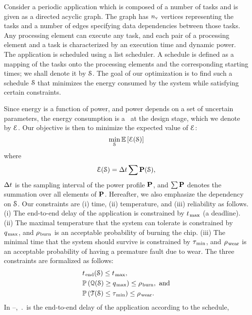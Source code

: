 Consider a periodic application which is composed of a number of tasks and is given as a directed acyclic graph.
The graph has ${n_\text{v}}$ vertices representing the tasks and a number of edges specifying data dependencies between those tasks.
Any processing element can execute any task, and each pair of a processing element and a task is characterized by an execution time and dynamic power.
The application is scheduled using a list scheduler.
A schedule is defined as a mapping of the tasks onto the processing elements and the corresponding starting times; we shall denote it by $\EuScript{S}$.
The goal of our optimization is to find such a schedule $\EuScript{S}$ that minimizes the energy consumed by the system while satisfying certain constraints.

Since energy is a function of power, and power depends on a set of uncertain parameters, the energy consumption is a \rv\ at the design stage, which we denote by $\EuScript{E}$.
Our objective is then to minimize the expected value of $\EuScript{E}$:
\begin{equation} \elab{objective}
  \min_{\schedule} \expectation{\qoiE(\schedule)}
\end{equation}
where
\[
  \EuScript{E}(\EuScript{S}) = \Delta t \sum \mathbf{P}(\EuScript{S}),
\]
$\Delta t$ is the sampling interval of the power profile $\mathbf{P}$, and $\sum \mathbf{P}$ denotes the summation over all elements of $\mathbf{P}$.
Hereafter, we also emphasize the dependency on $\EuScript{S}$.
Our constraints are (i) time, (ii) temperature, and (iii) reliability as follows.
(i) The end-to-end delay of the application is constrained by $t_{\text{\kern0.1emmax}}$ (a deadline).
(ii) The maximal temperature that the system can tolerate is constrained by $q_{\text{\kern0.1emmax}}$, and $\rho_{\text{\kern0.1emburn}}$ is an acceptable probability of burning the chip.
(iii) The minimal time that the system should survive is constrained by $\tau_{\text{\kern0.1emmin}}$, and $\rho_{\text{\kern0.1emwear}}$ is an acceptable probability of having a premature fault due to wear.
The three constraints are formalized as follows:
\begin{align}
  & \period(\schedule) \leq \t_\maximal, \elab{timing-constraint} \\
  & \probabilityMeasure\left( \qoiQ(\schedule) \geq \q_\maximal \right) \leq \pr_\burn, \text{ and} \elab{thermal-constraint} \\
  & \probabilityMeasure\left( \qoiT(\schedule) \leq \T_\minimal \right) \leq \pr_\wear. \elab{reliability-constraint}
\end{align}
In --, $\period$ is the end-to-end delay of the application according to the schedule,
